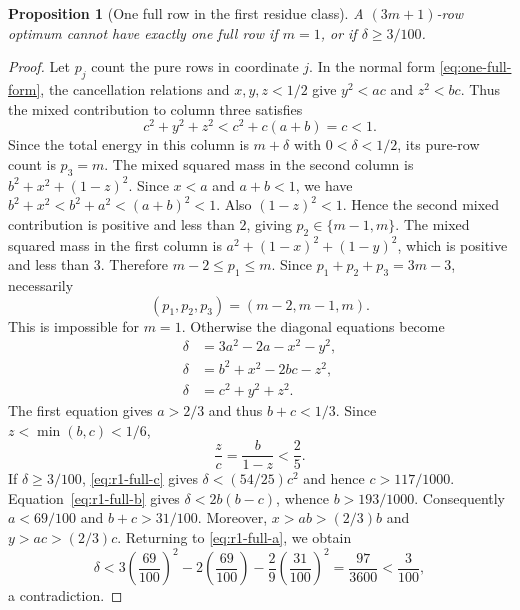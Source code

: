 \documentclass[11pt]{article}
\numberwithin{equation}{section}
\newtheorem{proposition}[proposition]{Proposition}
\theoremstyle{definition}
\theoremstyle{definition}
\begin{document}
\begin{proposition}[One full row in the first residue class]
\label{prop:r1-one-full}
A $(3m+1)$-row optimum cannot have exactly one full row if $m=1$,
or if $\delta\ge3/100$.
\end{proposition}
\begin{proof}
Let $p_j$ count the pure rows in coordinate $j$.  In the normal form \eqref{eq:one-full-form}, the cancellation
relations and $x,y,z<1/2$ give $y^2<ac$ and $z^2<bc$.
Thus the mixed contribution to column three satisfies
\[
 c^2+y^2+z^2<c^2+c(a+b)=c<1.
\]
Since the total energy in this column is $m+\delta$ with
$0<\delta<1/2$, its pure-row count is $p_3=m$.
The mixed squared mass in the second column is
$b^2+x^2+(1-z)^2$. Since $x<a$ and $a+b<1$, we have
$b^2+x^2<b^2+a^2<(a+b)^2<1$. Also $(1-z)^2<1$.
Hence the second mixed contribution is positive and less than $2$, giving
$p_2\in\{m-1,m\}$. The mixed squared mass in the first column is
$a^2+(1-x)^2+(1-y)^2$, which is positive and less than $3$.
Therefore $m-2\le p_1\le m$.  Since $p_1+p_2+p_3=3m-3$, necessarily
\[
 (p_1,p_2,p_3)=(m-2,m-1,m).
\]
This is impossible for $m=1$.  Otherwise the diagonal equations become
\begin{align}
 \delta&=3a^2-2a-x^2-y^2,\label{eq:r1-full-a}\\
 \delta&=b^2+x^2-2bc-z^2,\label{eq:r1-full-b}\\
 \delta&=c^2+y^2+z^2.\label{eq:r1-full-c}
\end{align}
The first equation gives $a>2/3$ and thus $b+c<1/3$.
Since $z<\min(b,c)<1/6$,
\[
 \frac{z}{c}=\frac{b}{1-z}<\frac25.
\]
If $\delta\ge3/100$, \eqref{eq:r1-full-c} gives
$\delta<(54/25)c^2$ and hence $c>117/1000$.
Equation~\eqref{eq:r1-full-b} gives
$\delta<2b(b-c)$, whence $b>193/1000$.
Consequently $a<69/100$ and $b+c>31/100$.
Moreover, $x>ab>(2/3)b$ and $y>ac>(2/3)c$.  Returning to
\eqref{eq:r1-full-a}, we obtain
\[
 \delta<3\left(\frac{69}{100}\right)^2
           -2\left(\frac{69}{100}\right)
           -\frac29\left(\frac{31}{100}\right)^2
       =\frac{97}{3600}<\frac3{100},
\]
a contradiction.
\end{proof}
\end{document}
